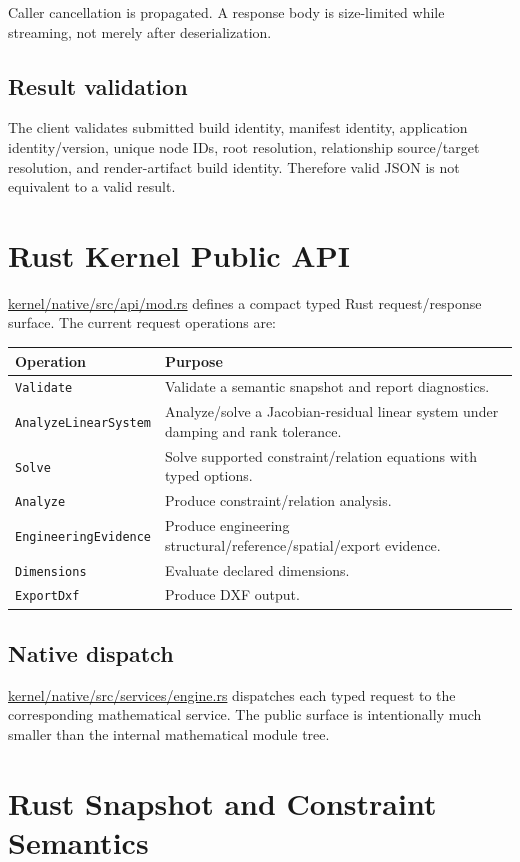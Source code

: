 \documentclass[11pt,a4paper]{report}
\newcommand{\pathref}[1]{\url{#1}}
\begin{document}
Caller cancellation is propagated. A response body is size-limited while streaming, not merely after deserialization.

\section{Result validation}
The client validates submitted build identity, manifest identity, application identity/version, unique node IDs, root resolution, relationship source/target resolution, and render-artifact build identity. Therefore valid JSON is not equivalent to a valid result.

\chapter{Rust Kernel Public API}

\pathref{kernel/native/src/api/mod.rs} defines a compact typed Rust request/response surface. The current request operations are:

\begin{tabularx}{\textwidth}{@{}p{}X@{}}
\toprule
Operation & Purpose \\
\midrule
\texttt{Validate} & Validate a semantic snapshot and report diagnostics. \\
\texttt{AnalyzeLinearSystem} & Analyze/solve a Jacobian-residual linear system under damping and rank tolerance. \\
\texttt{Solve} & Solve supported constraint/relation equations with typed options. \\
\texttt{Analyze} & Produce constraint/relation analysis. \\
\texttt{EngineeringEvidence} & Produce engineering structural/reference/spatial/export evidence. \\
\texttt{Dimensions} & Evaluate declared dimensions. \\
\texttt{ExportDxf} & Produce DXF output. \\
\bottomrule
\end{tabularx}

\section{Native dispatch}
\pathref{kernel/native/src/services/engine.rs} dispatches each typed request to the corresponding mathematical service. The public surface is intentionally much smaller than the internal mathematical module tree.

\chapter{Rust Snapshot and Constraint Semantics}
\end{document}
